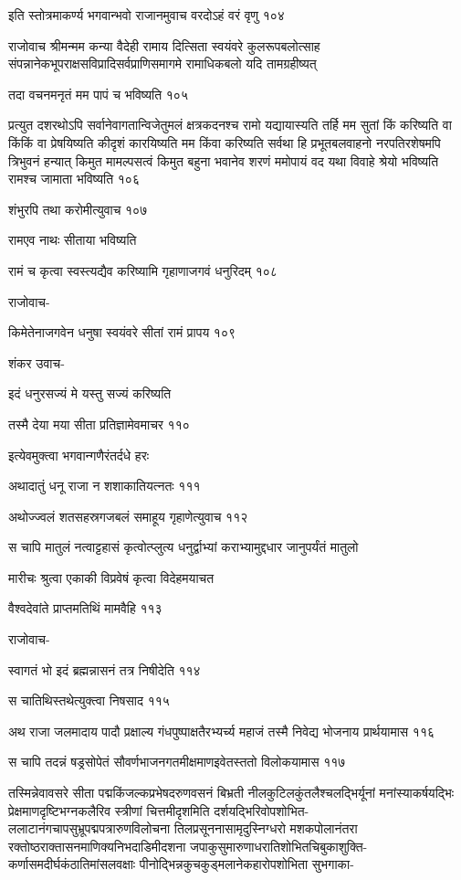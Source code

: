 इति स्तोत्रमाकर्ण्य भगवान्भवो राजानमुवाच वरदोऽहं वरं वृणु १०४

राजोवाच श्रीमन्मम कन्या वैदेही रामाय दित्सिता स्वयंवरे कुलरूपबलोत्साह
संपन्नानेकभूपराक्षसविप्रादिसर्वप्राणिसमागमे रामाधिकबलो यदि तामग्रहीष्यत्

तदा वचनमनृतं मम पापं च भविष्यति १०५

प्रत्युत दशरथोऽपि सर्वानेवागतान्विजेतुमलं क्षत्रकदनश्च रामो यद्यायास्यति तर्हि मम सुतां
किं करिष्यति वा किंकिं वा प्रेषयिष्यति कीदृशं कारयिष्यति मम किंवा करिष्यति सर्वथा हि
प्रभूतबलवाहनो नरपतिरशेषमपि त्रिभुवनं हन्यात् किमुत मामल्पसत्वं किमुत बहुना भवानेव शरणं
ममोपायं वद यथा विवाहे श्रेयो भविष्यति रामश्च जामाता भविष्यति १०६

शंभुरपि तथा करोमीत्युवाच १०७

रामएव नाथः सीताया भविष्यति

रामं च कृत्वा स्वस्त्यद्यैव करिष्यामि गृहाणाजगवं धनुरिदम् १०८

राजोवाच-

किमेतेनाजगवेन धनुषा स्वयंवरे सीतां रामं प्रापय १०९

शंकर उवाच-

इदं धनुरसज्यं मे यस्तु सज्यं करिष्यति

तस्मै देया मया सीता प्रतिज्ञामेवमाचर ११०

इत्येवमुक्त्वा भगवान्गणैरंतर्दधे हरः

अथादातुं धनू राजा न शशाकातियत्नतः १११

अथोज्ज्वलं शतसहस्रगजबलं समाहूय गृहाणेत्युवाच ११२

स चापि मातुलं नत्वाट्टहासं कृत्वोत्प्लुत्य धनुर्द्वाभ्यां कराभ्यामुद्दधार जानुपर्यंतं मातुलो

मारीचः श्रुत्वा एकाकी विप्रवेषं कृत्वा विदेहमयाचत

वैश्वदेवांते प्राप्तमतिथिं मामवैहि ११३

राजोवाच-

स्वागतं भो इदं ब्रह्मन्नासनं तत्र निषीदेति ११४

स चातिथिस्तथेत्युक्त्वा निषसाद ११५

अथ राजा जलमादाय पादौ प्रक्षाल्य गंधपुष्पाक्षतैरभ्यर्च्य महाजं तस्मै निवेद्य भोजनाय
प्रार्थयामास ११६

स चापि तदन्नं षड्रसोपेतं सौवर्णभाजनगतमीक्षमाणइवेतस्ततो विलोकयामास ११७

तस्मिन्नेवावसरे सीता पद्मकिंजल्कप्रभेषदरुणवसनं बिभ्रती नीलकुटिलकुंतलैश्चलद्भिर्यूनां
मनांस्याकर्षयद्भिः प्रेक्षमाणदृष्टिभग्नकलैरिव स्त्रीणां चित्तमीदृशमिति
दर्शयद्भिरिवोपशोभित-ललाटानंगचापसुभ्रूपद्मपत्रारुणविलोचना तिलप्रसूननासामृदुस्निग्धरो
मशकपोलानंतरा रक्तोष्ठराक्तासनमाणिक्यनिभदाडिमीदशना
जपाकुसुमारुणाधरातिशोभितचिबुकाशुक्ति-कर्णासमदीर्घकंठातिमांसलवक्षाः
पीनोद्भिन्नकुचकुड्मलानेकहारोपशोभिता सुभगाका-

